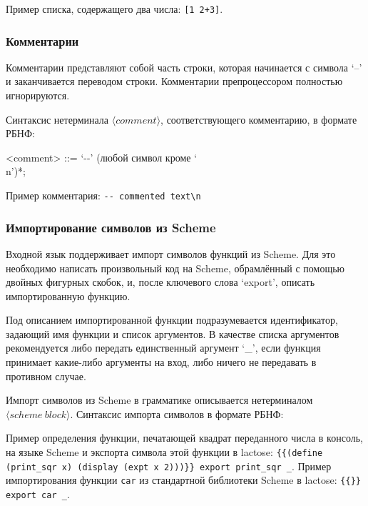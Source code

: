 \documentclass[12pt,a4paper,oneside]{extarticle}
\begin{document}
            Пример списка, содержащего два числа: \lstinline$[1 2+3]$.

        \subsubsection{Комментарии}
            Комментарии представляют собой часть строки, которая начинается с символа `--' и заканчивается переводом строки.
            Комментарии препроцессором полностью игнорируются.

            Синтаксис нетерминала $\langle comment \rangle$, соответствующего комментарию, в формате РБНФ:

            \begin{grammar}
                <comment> ::= `-\null-' (любой символ кроме `\\n')*;
            \end{grammar}

            Пример комментария: \lstinline$-- commented text\n$
            

        \subsubsection{Импортирование символов из Scheme}
            Входной язык поддерживает импорт символов функций из Scheme.
            Для это необходимо написать произвольный код на Scheme, обрамлённый с помощью двойных фигурных скобок, и, после ключевого слова `export', описать импортированную функцию.

            Под описанием импортированной функции подразумевается идентификатор, задающий имя функции и список аргументов.
            В качестве списка аргументов рекомендуется либо передать единственный аргумент `\_', если функция принимает какие-либо аргументы на вход, либо ничего не передавать в противном случае.

            Импорт символов из Scheme в грамматике описывается нетерминалом $\langle scheme~block \rangle$. Синтаксис импорта символов в формате РБНФ:            
            \begin{grammar}
                <scheme block> ::= <SCHEME BODY> `export' <IDENTIFIER> <function arguments> 

                <SCHEME BODY> ::= `{{' (любой символ кроме `}')* `}}'
            \end{grammar}

            Пример определения функции, печатающей квадрат переданного числа в консоль, на языке Scheme и экспорта символа этой функции в lactose: \lstinline${{(define (print_sqr x) (display (expt x 2)))}} export print_sqr _$.
            Пример импортирования функции \lstinline$car$ из стандартной библиотеки Scheme в lactose: \lstinline${{}} export car _$.
        
\end{document}
